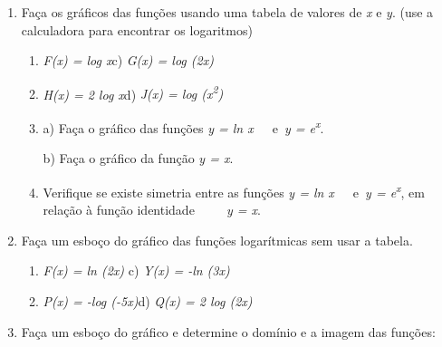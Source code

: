 \documentclass[12pt]{article}
\begin{document}
\vspace{\baselineskip}
\begin{enumerate}
	\item Faça os gráficos das funções usando uma tabela de valores de \textit{x} e \textit{y}. (use a calculadora para encontrar os logaritmos)\par

\begin{enumerate}
	\item \textit{F(x) = log x\tab }\tab c) \textit{G(x) = log (2x)}\par

	\item \textit{H(x) = 2 log x\tab }\tab d) \textit{J(x) = log (x\textsuperscript{2})}\par


\vspace{\baselineskip}
	\item a) Faça o gráfico das funções \textit{y = ln x}\ \ \ e\   \textit{y = e\textsuperscript{x}}.\  \par

b) Faça o gráfico da função \textit{y = x}.\par

	\item Verifique se existe simetria entre as funções \textit{y = ln x}\ \ \ e\   \textit{y = e\textsuperscript{x}}, em relação à função identidade\ \ \ \ \  \textit{y = x}.
\end{enumerate}\par


\vspace{\baselineskip}
	\item Faça um esboço do gráfico das funções logarítmicas sem usar a tabela.\par

\begin{enumerate}
	\item \textit{F(x) = ln (2x)} \tab \tab \tab c) \textit{Y(x) = -ln (3x)}\par

	\item \textit{P(x) = -log (-5x)\tab \tab \tab }d) \textit{Q(x) = 2 log (2x)} 
\end{enumerate}\par


\vspace{\baselineskip}
	\item Faça um esboço do gráfico e determine o domínio e a imagem das funções:\par


\end{enumerate}
\end{document}
